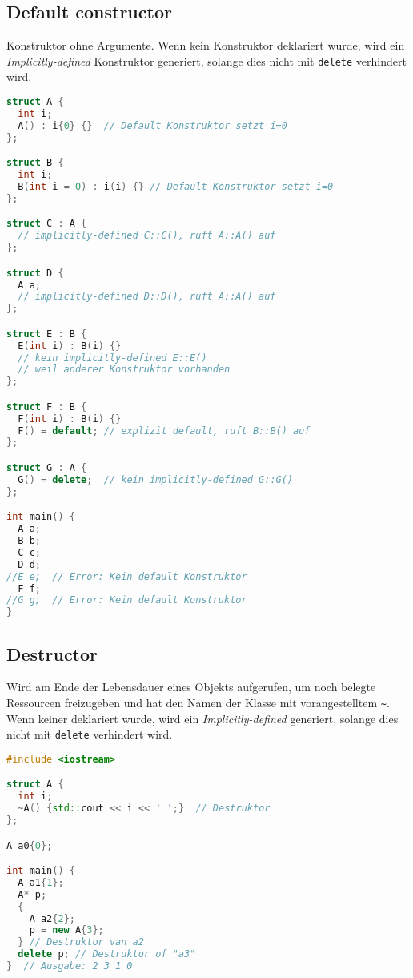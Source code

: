 \subsection{Default constructor}

Konstruktor ohne Argumente. Wenn kein Konstruktor deklariert wurde, wird ein
\emph{Implicitly-defined} Konstruktor generiert, solange dies nicht mit
\lstinline|delete| verhindert wird.

\begin{lstlisting}[language=C++]
struct A {
  int i;
  A() : i{0} {}  // Default Konstruktor setzt i=0
};

struct B {
  int i;
  B(int i = 0) : i(i) {} // Default Konstruktor setzt i=0
};

struct C : A {
  // implicitly-defined C::C(), ruft A::A() auf
};

struct D {
  A a;
  // implicitly-defined D::D(), ruft A::A() auf
};

struct E : B {
  E(int i) : B(i) {}
  // kein implicitly-defined E::E()
  // weil anderer Konstruktor vorhanden
};

struct F : B {
  F(int i) : B(i) {}
  F() = default; // explizit default, ruft B::B() auf
};

struct G : A {
  G() = delete;  // kein implicitly-defined G::G()
};

int main() {
  A a;
  B b;
  C c;
  D d;
//E e;  // Error: Kein default Konstruktor
  F f;
//G g;  // Error: Kein default Konstruktor
}
\end{lstlisting}

\subsection{Destructor}

Wird am Ende der Lebensdauer eines Objekts aufgerufen, um noch belegte
Ressourcen freizugeben und hat den Namen der Klasse mit vorangestelltem
\lstinline|~|. Wenn keiner deklariert wurde, wird ein \emph{Implicitly-defined}
generiert, solange dies nicht mit \lstinline|delete| verhindert wird.

\begin{lstlisting}[language=C++]
#include <iostream>

struct A {
  int i;
  ~A() {std::cout << i << ' ';}  // Destruktor
};

A a0{0};

int main() {
  A a1{1};
  A* p;
  {
    A a2{2};
    p = new A{3};
  } // Destruktor van a2
  delete p; // Destruktor of "a3"
}  // Ausgabe: 2 3 1 0
\end{lstlisting}

